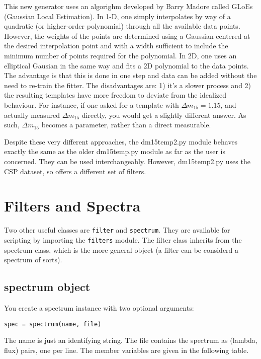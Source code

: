 \documentclass[12pt]{article}
\begin{document}
This new generator uses an algorighm developed by Barry Madore called
GLoEs (Gaussian Local Estimation). In 1-D, one simply interpolates
by way of a quadratic (or higher-order polynomial) through all the
available data points. However, the weights of the points are determined
using a Gaussian centered at the desired interpolation point and with
a width sufficient to include the minimum number of points required
for the polynomial. In 2D, one uses an elliptical Gausian in the same
way and fits a 2D polynomial to the data points. The advantage is
that this is done in one step and data can be added without the need
to re-train the fitter. The disadvantages are: 1) it's a slower process
and 2) the resulting templates have more freedom to deviate from the
idealized behaviour. For instance, if one asked for a template with
$\Delta m_{15}=1.15$, and actually measured $\Delta m_{15}$ directly,
you would get a slightly different answer. As such, $\Delta m_{15}$
becomes a parameter, rather than a direct measurable.

Despite these very different approaches, the dm15temp2.py module behaves
exactly the same as the older dm15temp.py module as far as the user
is concerned. They can be used interchangeably. However, dm15temp2.py
uses the CSP dataset, so offers a different set of filters.


\section{Filters and Spectra\label{sec:Filters-and-Spectra}}

Two other useful classes are \texttt{filter} and \texttt{spectrum}.
They are available for scripting by importing the \texttt{filters}
module. The filter class inherits from the spectrum class, which is
the more general object (a filter can be considerd a spectrum of sorts).


\subsection{spectrum object}

You create a spectrum instance with two optional arguments:

\begin{verbatim}
spec = spectrum(name, file)
\end{verbatim}


The name is just an identifying string. The file contains the spectrum
as (lambda, flux) pairs, one per line. The member variables are given
in the following table.
\end{document}
